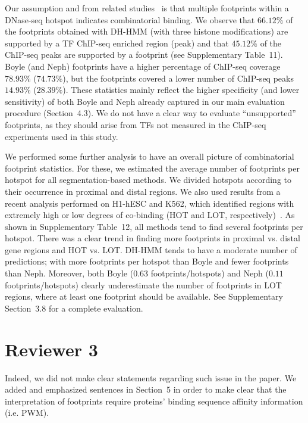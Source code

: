 \documentclass[11pt]{article}
\begin{document}
Our  assumption and from related studies~\citep{neph2012a,jankowski2013,boyle2011} is that multiple footprints within a DNase-seq hotspot indicates combinatorial binding. We observe that $66.12\%$ of the footprints obtained with DH-HMM (with three histone modifications) are supported by a TF ChIP-seq enriched region (peak) and that $45.12\%$ of the ChIP-seq peaks are supported by a footprint (see Supplementary Table~11). Boyle (and Neph) footprints have a higher percentage of ChIP-seq coverage $78.93\%$ ($74.73\%$), but the footprints covered a lower number of ChIP-seq peaks $14.93\%$ ($28.39\%$). These statistics mainly reflect the higher specificity (and lower sensitivity) of both Boyle and Neph already captured in our main evaluation procedure (Section~4.3). We do not have a clear way to evaluate ``unsupported'' footprints, as they should  arise from TFs not measured in the ChIP-seq experiments used in this study.

We performed some further analysis to have an overall picture of combinatorial footprint statistics. For these, we estimated the average number of footprints per hotspot for all segmentation-based methods. We divided hotspots according to their occurrence in proximal and distal regions. We also used results from a recent analysis performed on H1-hESC and K562, which identified regions with extremely high or low degrees of co-binding (HOT and LOT, respectively)~\citep{yip2012}. As shown in Supplementary Table~12, all methods tend to find several footprints per hotspot. There was a clear trend in finding more footprints in proximal vs. distal gene regions and HOT vs. LOT. DH-HMM tends to have a moderate number of predictions; with more footprints per hotspot than Boyle and fewer footprints than Neph. Moreover, both Boyle ($0.63$ footprints/hotspots) and Neph ($0.11$ footprints/hotspots) clearly underestimate the number of footprints in LOT regions, where at least one footprint should be available. See Supplementary Section~3.8 for a complete evaluation.

\section*{Reviewer 3}


Indeed, we did not make clear statements regarding such issue in the paper. We added and emphasized sentences in Section~5 in order to make clear that the interpretation of footprints require proteins' binding sequence affinity information (i.e. PWM).
\end{document}
